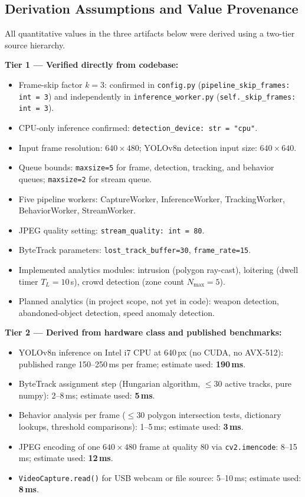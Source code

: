 \documentclass[11pt]{article}
\begin{document}
\subsection*{Derivation Assumptions and Value Provenance}

All quantitative values in the three artifacts below were derived using a two-tier source hierarchy.

\textbf{Tier 1 — Verified directly from codebase:}
\begin{itemize}
\item Frame-skip factor $k = 3$: confirmed in \texttt{config.py} (\texttt{pipeline\_skip\_frames: int = 3}) and independently in \texttt{inference\_worker.py} (\texttt{self.\_skip\_frames: int = 3}).
\item CPU-only inference confirmed: \texttt{detection\_device: str = "cpu"}.
\item Input frame resolution: $640 \times 480$; YOLOv8n detection input size: $640 \times 640$.
\item Queue bounds: \texttt{maxsize=5} for frame, detection, tracking, and behavior queues; \texttt{maxsize=2} for stream queue.
\item Five pipeline workers: CaptureWorker, InferenceWorker, TrackingWorker, BehaviorWorker, StreamWorker.
\item JPEG quality setting: \texttt{stream\_quality: int = 80}.
\item ByteTrack parameters: \texttt{lost\_track\_buffer=30}, \texttt{frame\_rate=15}.
\item Implemented analytics modules: intrusion (polygon ray-cast), loitering (dwell timer $T_L = 10$\,s), crowd detection (zone count $N_{\max} = 5$).
\item Planned analytics (in project scope, not yet in code): weapon detection, abandoned-object detection, speed anomaly detection.
\end{itemize}

\textbf{Tier 2 — Derived from hardware class and published benchmarks:}
\begin{itemize}
\item YOLOv8n inference on Intel i7 CPU at 640\,px (no CUDA, no AVX-512): published range 150--250\,ms per frame; estimate used: \textbf{190\,ms}.
\item ByteTrack assignment step (Hungarian algorithm, $\le30$ active tracks, pure numpy): 2--8\,ms; estimate used: \textbf{5\,ms}.
\item Behavior analysis per frame ($\le30$ polygon intersection tests, dictionary lookups, threshold comparisons): 1--5\,ms; estimate used: \textbf{3\,ms}.
\item JPEG encoding of one $640 \times 480$ frame at quality 80 via \texttt{cv2.imencode}: 8--15\,ms; estimate used: \textbf{12\,ms}.
\item \texttt{VideoCapture.read()} for USB webcam or file source: 5--10\,ms; estimate used: \textbf{8\,ms}.
\end{itemize}
\end{document}
